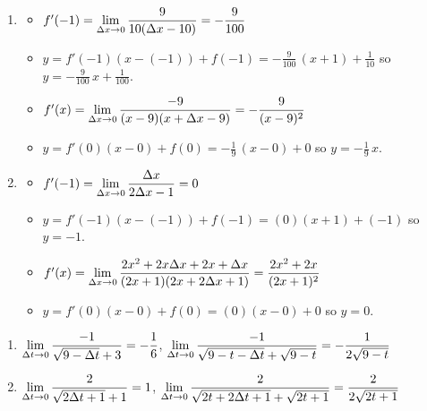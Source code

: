 \begin{enumerate}
\setcounter{enumi}{\value{HW}}

\item   \begin{itemize}

\item  $f'(-1) = \displaystyle{ \lim_{\Delta x \rightarrow 0} \dfrac{9}{10(\Delta x - 10)} = -\dfrac{9}{100}}$

\smallskip

\item $y = f'(-1)(x-(-1)) + f(-1) = -\frac{9}{100} \, (x+1) + \frac{1}{10}$ so $y = - \frac{9}{100} \, x + \frac{1}{100}$.

\smallskip

\item  $f'(x) =\displaystyle{ \lim_{\Delta x \rightarrow 0} \dfrac{-9}{(x - 9)(x + \Delta x - 9)} =   -\dfrac{9}{(x-9)^2}}$   

\smallskip  

\item  $y = f'(0)(x-0) + f(0) = -\frac{1}{9} \, (x-0)+0$ so $y = -\frac{1}{9} \, x$.

\smallskip

\end{itemize}

\item \begin{itemize}  

\item  $f'(-1) = \displaystyle{ \lim_{\Delta x \rightarrow 0} \dfrac{\Delta x}{2 \Delta x - 1} = 0}$

\smallskip

\item $y = f'(-1)(x-(-1)) + f(-1) = (0) (x+1) + (-1)$ so $y = -1$.

\smallskip

\item  $f'(x) =\displaystyle{ \lim_{\Delta x \rightarrow 0}\dfrac{2x^2+2x\Delta x+2x+\Delta x}{(2x+1)(2x+2\Delta x+1)}=  \dfrac{2x^2+2x}{(2x+1)^2}}$

\smallskip

\item  $y = f'(0)(x-0) + f(0) = (0)(x-0)+0$ so $y = 0$.

\smallskip

\end{itemize}


\setcounter{HW}{\value{enumi}}
\end{enumerate}

\begin{enumerate}
\setcounter{enumi}{\value{HW}}

\item  $\displaystyle{ \lim_{\Delta t \rightarrow 0}\dfrac{-1}{\sqrt{9-\Delta t} +3}  = -\dfrac{1}{6}}$,   $\displaystyle{ \lim_{\Delta t \rightarrow 0} \dfrac{-1}{\sqrt{9-t-\Delta t} + \sqrt{9-t}}=   -\dfrac{1}{2 \sqrt{9-t}}}$   
\item  $\displaystyle{ \lim_{\Delta t \rightarrow 0}\dfrac{2}{\sqrt{2\Delta t+1} + 1}  =1}$,   $\displaystyle{ \lim_{\Delta t \rightarrow 0}\dfrac{2}{\sqrt{2t+2\Delta t+1} + \sqrt{2t+1}}=   \dfrac{2}{2 \sqrt{2t+1}}}$    

\setcounter{HW}{\value{enumi}}
\end{enumerate}

